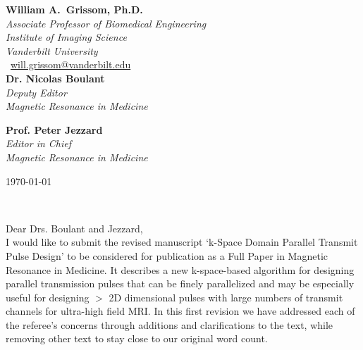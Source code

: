 \documentclass[11pt]{article}
\def\firstname{William A.}
\def\familyname{Grissom, Ph.D.}
\begin{document}
\sffamily   %
\raggedright%
{\bfseries \firstname~\familyname}\\[.35ex]
\small{\itshape%
Associate Professor of Biomedical Engineering\\
Institute of Imaging Science\\
Vanderbilt University\\}
\Letter~\href{mailto:will.grissom@vanderbilt.edu}{will.grissom@vanderbilt.edu}\\[2em]
{\bfseries Dr. Nicolas Boulant}\\[.35ex]
\small{\itshape
Deputy Editor\\
Magnetic Resonance in Medicine\\[1em]}

{\bfseries Prof. Peter Jezzard}\\[.35ex]
\small{\itshape
Editor in Chief\\
Magnetic Resonance in Medicine\\[1em]}


%
\large
\hfill\begin{minipage}[t]{\textwidth} %
\raggedleft %
\today
\end{minipage}\\[2em]
\raggedright
Dear Drs. Boulant and Jezzard,\\[1.5em]
%
I would like to submit the revised manuscript `k-Space Domain Parallel Transmit Pulse Design' to be considered
for publication as a Full Paper in Magnetic Resonance in Medicine. 
It describes a new k-space-based algorithm for designing parallel transmission pulses that can be finely parallelized
and may be especially useful for designing $>$ 2D dimensional pulses with large numbers of transmit channels
for ultra-high field MRI. 
In this first revision we have addressed each of the referee's concerns through additions and clarifications to the text, 
while removing other text to stay close to our original word count. 
\end{document}
